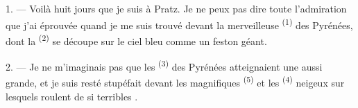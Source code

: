 %
%
%
%
%

\VUsaut{4.0mm}
\VUsaut{3.0mm}

\VUsaut{3.0mm}

\VUsaut{3.0mm}

1. --- Voilà huit jours que je suis à Pratz. Je ne peux pas dire toute
l'admiration que j'ai éprouvée quand je me suis trouvé devant la merveilleuse
 \textsuperscript{(1)} des Pyrénées, dont la 
\textsuperscript{(2)} se découpe sur le ciel bleu comme un feston géant.

2. --- Je ne m'imaginais pas que les  \textsuperscript{(3)} des
Pyrénées atteignaient une  aussi grande, et je suis resté
stupéfait devant les magnifiques  \textsuperscript{(5)} et les
 \textsuperscript{(4)} neigeux sur lesquels roulent de si terribles
.

